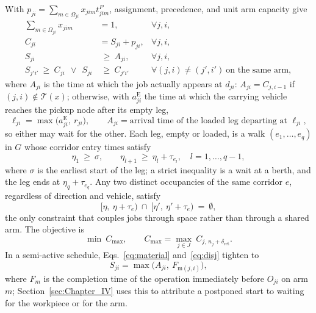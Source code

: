 With $p_{ji}=\sum_{m\in\Omega_{ji}}x_{jim}t^P_{jim}$, assignment, precedence, and unit arm capacity give
\begin{align}
\sum_{m\in\Omega_{ji}} x_{jim} &= 1, & \forall j,i,
\label{eq:assign}\\
C_{ji} &= S_{ji}+p_{ji}, & \forall j,i,
\label{eq:dur}\\
S_{ji} &\ \ge\ A_{ji}, & \forall j,i,
\label{eq:material}\\
S_{j'i'}\ \ge\ C_{ji}\ \ \vee\ \ S_{ji} &\ \ge\ C_{j'i'}
& \forall (j,i)\neq(j',i')\ \text{on the same arm},
\label{eq:disj}
\end{align}
where $A_{ji}$ is the time at which the job actually appears at $d_{ji}$: $A_{ji}=C_{j,i-1}$ if $(j,i)\notin\mathcal{T}(x)$; otherwise, with $a^{\mathrm{E}}_{ji}$ the time at which the carrying vehicle reaches the pickup node after its empty leg,
\begin{equation}
\label{eq:load}
\ell_{ji}=\max\bigl(a^{\mathrm{E}}_{ji},\ r_{ji}\bigr),
\qquad
A_{ji}=\text{arrival time of the loaded leg departing at } \ell_{ji},
\end{equation}
so either may wait for the other.
Each leg, empty or loaded, is a walk $(e_1,\dots,e_q)$ in $G$ whose corridor entry times satisfy
\begin{equation}
\label{eq:walk}
\eta_1 \ \ge\ \sigma, \qquad
\eta_{l+1}\ \ge\ \eta_l+\tau_{e_l}, \quad l=1,\dots,q-1,
\end{equation}
where $\sigma$ is the earliest start of the leg; a strict inequality is a wait at a berth, and the leg ends at $\eta_q+\tau_{e_q}$.
Any two distinct occupancies of the same corridor $e$, regardless of direction and vehicle, satisfy
\begin{equation}
\label{eq:excl}
\bigl[\eta,\ \eta+\tau_e\bigr)\ \cap\
\bigl[\eta',\ \eta'+\tau_e\bigr)\ =\ \emptyset ,
\end{equation}
the only constraint that couples jobs through space rather than through a shared arm. The objective is
\begin{equation}
\label{eq:obj}
\min\ C_{\max},\qquad
C_{\max}=\max_{j\in J}\ C_{j,\,n_j+\delta_{\mathrm{ret}}} .
\end{equation}
In a semi-active schedule, Eqs.~\eqref{eq:material} and~\eqref{eq:disj} tighten to
\begin{equation}
\label{eq:bind}
S_{ji}=\max\bigl(A_{ji},\ F_{\mathrm{m}(j,i)}\bigr),
\end{equation}
where $F_m$ is the completion time of the operation immediately before $O_{ji}$ on arm $m$; Section~\ref{sec:Chapter_IV} uses this to attribute a postponed start to waiting for the workpiece or for the arm.

